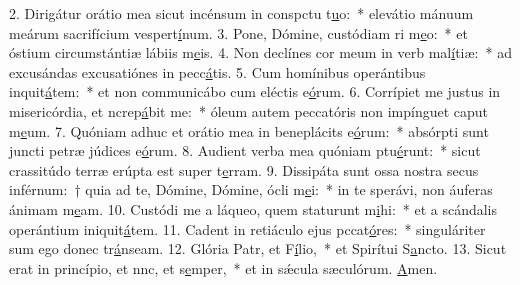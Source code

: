 2. Dirigátur orátio mea sicut incénsum in conspctu t\uline{u}o:~* elevátio mánuum meárum sacrifícium vespert\uline{í}num.
3. Pone, Dómine, custódiam ri m\uline{e}o:~* et óstium circumstántiæ lábiis m\uline{e}is.
4. Non declínes cor meum in verb mal\uline{í}tiæ:~* ad excusándas excusatiónes in pecc\uline{á}tis.
5. Cum homínibus operántibus inquit\uline{á}tem:~* et non communicábo cum eléctis e\uline{ó}rum.
6. Corrípiet me justus in misericórdia, et ncrep\uline{á}bit me:~* óleum autem peccatóris non impínguet caput m\uline{e}um.
7. Quóniam adhuc et orátio mea in beneplácits e\uline{ó}rum:~* absórpti sunt juncti petræ júdices e\uline{ó}rum.
8. Audient verba mea quóniam ptu\uline{é}runt:~* sicut crassitúdo terræ erúpta est super t\uline{e}rram.
9. Dissipáta sunt ossa nostra secus inférnum:~† quia ad te, Dómine, Dómine, ócli m\uline{e}i:~* in te sperávi, non áuferas ánimam m\uline{e}am.
10. Custódi me a láqueo, quem staturunt m\uline{i}hi:~* et a scándalis operántium iniquit\uline{á}tem.
11. Cadent in retiáculo ejus pccat\uline{ó}res:~* singuláriter sum ego donec tr\uline{á}nseam.
12. Glória Patr, et F\uline{í}lio,~* et Spirítui S\uline{a}ncto.
13. Sicut erat in princípio, et nnc, et s\uline{e}mper,~* et in sǽcula sæculórum. \uline{A}men.
